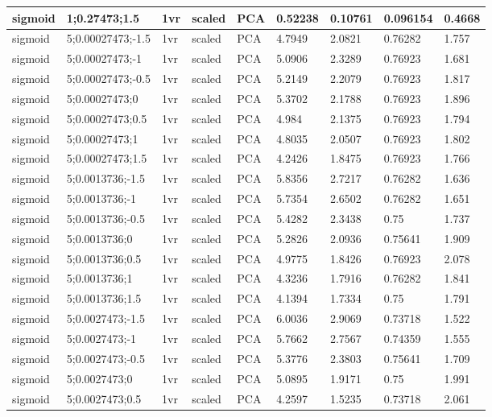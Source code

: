 \begin{longtable}{lllllllll}
sigmoid & 1;0.27473;1.5 & 1vr & scaled & PCA & 0.52238 & 0.10761 & 0.096154 & 0.4668\\ \hline
sigmoid & 5;0.00027473;-1.5 & 1vr & scaled & PCA & 4.7949 & 2.0821 & 0.76282 & 1.757\\ \hline
sigmoid & 5;0.00027473;-1 & 1vr & scaled & PCA & 5.0906 & 2.3289 & 0.76923 & 1.681\\ \hline
sigmoid & 5;0.00027473;-0.5 & 1vr & scaled & PCA & 5.2149 & 2.2079 & 0.76923 & 1.817\\ \hline
sigmoid & 5;0.00027473;0 & 1vr & scaled & PCA & 5.3702 & 2.1788 & 0.76923 & 1.896\\ \hline
sigmoid & 5;0.00027473;0.5 & 1vr & scaled & PCA & 4.984 & 2.1375 & 0.76923 & 1.794\\ \hline
sigmoid & 5;0.00027473;1 & 1vr & scaled & PCA & 4.8035 & 2.0507 & 0.76923 & 1.802\\ \hline
sigmoid & 5;0.00027473;1.5 & 1vr & scaled & PCA & 4.2426 & 1.8475 & 0.76923 & 1.766\\ \hline
sigmoid & 5;0.0013736;-1.5 & 1vr & scaled & PCA & 5.8356 & 2.7217 & 0.76282 & 1.636\\ \hline
sigmoid & 5;0.0013736;-1 & 1vr & scaled & PCA & 5.7354 & 2.6502 & 0.76282 & 1.651\\ \hline
sigmoid & 5;0.0013736;-0.5 & 1vr & scaled & PCA & 5.4282 & 2.3438 & 0.75 & 1.737\\ \hline
sigmoid & 5;0.0013736;0 & 1vr & scaled & PCA & 5.2826 & 2.0936 & 0.75641 & 1.909\\ \hline
sigmoid & 5;0.0013736;0.5 & 1vr & scaled & PCA & 4.9775 & 1.8426 & 0.76923 & 2.078\\ \hline
sigmoid & 5;0.0013736;1 & 1vr & scaled & PCA & 4.3236 & 1.7916 & 0.76282 & 1.841\\ \hline
sigmoid & 5;0.0013736;1.5 & 1vr & scaled & PCA & 4.1394 & 1.7334 & 0.75 & 1.791\\ \hline
sigmoid & 5;0.0027473;-1.5 & 1vr & scaled & PCA & 6.0036 & 2.9069 & 0.73718 & 1.522\\ \hline
sigmoid & 5;0.0027473;-1 & 1vr & scaled & PCA & 5.7662 & 2.7567 & 0.74359 & 1.555\\ \hline
sigmoid & 5;0.0027473;-0.5 & 1vr & scaled & PCA & 5.3776 & 2.3803 & 0.75641 & 1.709\\ \hline
sigmoid & 5;0.0027473;0 & 1vr & scaled & PCA & 5.0895 & 1.9171 & 0.75 & 1.991\\ \hline
sigmoid & 5;0.0027473;0.5 & 1vr & scaled & PCA & 4.2597 & 1.5235 & 0.73718 & 2.061\\ \hline

\end{longtable}
